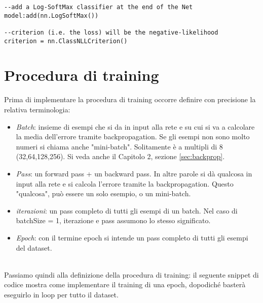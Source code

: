 \begin{lstlisting}[language={[5.2]Lua}]
--add a Log-SoftMax classifier at the end of the Net
model:add(nn.LogSoftMax())

--criterion (i.e. the loss) will be the negative-likelihood
criterion = nn.ClassNLLCriterion()
\end{lstlisting}


\section{Procedura di training}
Prima di implementare la procedura di training occorre definire con precisione la relativa terminologia: 
\begin{itemize}
\item \emph{Batch}: insieme di esempi che si da in input alla rete e su cui si va a calcolare la media dell'errore tramite backpropagation. Se gli esempi non sono molto numeri si chiama anche "mini-batch". Solitamente è a multipli di 8 (32,64,128,256). Si veda anche il Capitolo 2, sezione \ref{sec:backprop}.
\item \emph{Pass}: un forward pass + un backward pass. In altre parole si dà qualcosa in input alla rete e si calcola l'errore tramite la backpropagation. Questo "qualcosa", può essere un solo esempio, o un mini-batch.
\item \emph{iterazioni}: un pass completo di tutti gli esempi di un batch. Nel caso di batchSize = 1, iterazione e pass assumono lo stesso significato. 
\item \emph{Epoch}: con il termine epoch si intende un pass completo di tutti gli esempi del dataset.
\end{itemize}
\\
Passiamo quindi alla definizione della procedura di training: il seguente snippet di codice mostra come implementare il training di una epoch, dopodiché basterà eseguirlo in loop per tutto il dataset. 

